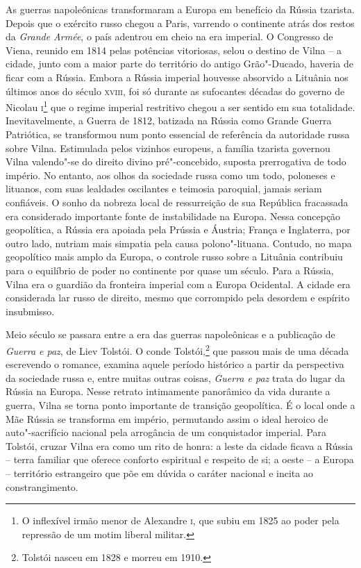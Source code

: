 
As guerras napoleônicas transformaram a Europa em benefício da Rússia
tzarista. Depois que o exército russo chegou a Paris, varrendo o
continente atrás dos restos da \textit{Grande Armée}, o país adentrou em
cheio na era imperial. 
O Congresso de Viena, reunido em 1814 pelas
potências vitoriosas, selou o destino de Vilna -- a cidade, junto com
a maior parte do território do antigo Grão"-Ducado, haveria de ficar com a
Rússia. Embora a Rússia imperial houvesse absorvido a Lituânia nos
últimos anos do século \textsc{xviii}, foi só durante as sufocantes décadas do
governo de Nicolau \textsc{i}\footnote{O inflexível irmão menor de Alexandre \textsc{i}, que subiu
em 1825 ao poder pela repressão de um motim liberal militar.} que o
regime imperial restritivo chegou a ser sentido em sua totalidade.
Inevitavelmente, a Guerra de 1812, batizada na Rússia como Grande Guerra
Patriótica, se transformou num ponto essencial de referência da
autoridade russa sobre Vilna. Estimulada pelos vizinhos europeus, a
família tzarista governou Vilna valendo"-se do direito divino
pré"-concebido, suposta prerrogativa de todo império. No entanto, aos
olhos da sociedade russa como um todo, poloneses e lituanos, com suas
lealdades oscilantes e teimosia paroquial, jamais seriam confiáveis. O
sonho da nobreza local de ressurreição de sua República fracassada era
considerado importante fonte de instabilidade na Europa. Nessa concepção
geopolítica, a Rússia era apoiada pela Prússia e Áustria; França e
Inglaterra, por outro lado, nutriam mais simpatia pela causa
polono"-lituana. Contudo, no mapa geopolítico mais amplo da Europa, o
controle russo sobre a Lituânia contribuiu para o equilíbrio de poder no
continente por quase um século. Para a Rússia, Vilna era o guardião da
fronteira imperial com a Europa Ocidental. A cidade era considerada lar
russo de direito, mesmo que corrompido pela desordem e espírito
insubmisso.

Meio século se passara entre a era das guerras napoleônicas e a
publicação de \textit{Guerra e paz}, de Liev Tolstói. O conde Tolstói,\footnote{Tolstói nasceu em 1828 e morreu em 1910.} que passou mais de uma década escrevendo o romance, examina
aquele período histórico a partir da perspectiva da sociedade russa e,
entre muitas outras coisas, \textit{Guerra e paz} trata do lugar da Rússia
na Europa. Nesse retrato intimamente panorâmico da vida durante a
guerra, Vilna se torna ponto importante de transição geopolítica. É o
local onde a Mãe Rússia se transforma em império, permutando assim o
ideal heroico de auto"-sacrifício nacional pela arrogância de um
conquistador imperial. Para Tolstói, cruzar Vilna era como um rito de
honra: a leste da cidade ficava a Rússia -- terra familiar que oferece
conforto espiritual e respeito de si; a oeste -- a Europa -- território
estrangeiro que põe em dúvida o caráter nacional e incita ao
constrangimento.


